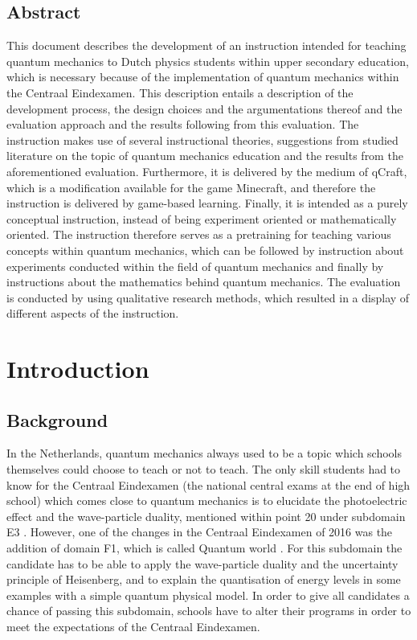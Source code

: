 \documentclass[11pt,twoside]{report} %
\begin{document}
\chapter{Abstract}

This document describes the development of an instruction intended for teaching quantum mechanics to Dutch physics students within upper secondary education, which is necessary because of the implementation of quantum mechanics within the Centraal Eindexamen. This description entails a description of the development process, the design choices and the argumentations thereof and the evaluation approach and the results following from this evaluation. The instruction makes use of several instructional theories, suggestions from studied literature on the topic of quantum mechanics education and the results from the aforementioned evaluation. Furthermore, it is delivered by the medium of qCraft, which is a modification available for the game Minecraft, and therefore the instruction is delivered by game-based learning. Finally, it is intended as a purely conceptual instruction, instead of being experiment oriented or mathematically oriented. The instruction therefore serves as a pretraining for teaching various concepts within quantum mechanics, which can be followed by instruction about experiments conducted within the field of quantum mechanics and finally by instructions about the mathematics behind quantum mechanics. The evaluation is conducted by using qualitative research methods, which resulted in a display of different aspects of the instruction.

\part{Introduction}

\chapter{Background}

In the Netherlands, quantum mechanics always used to be a topic which schools themselves could choose to teach or not to teach. The only skill students had to know for the Centraal Eindexamen (the national central exams at the end of high school) which comes close to quantum mechanics is to elucidate the photoelectric effect and the wave-particle duality, mentioned within point 20 under subdomain E3 \cite{eindexamen2015}. However, one of the changes in the Centraal Eindexamen of 2016 was the addition of domain F1, which is called Quantum world \cite{eindexamen2016}. For this subdomain the candidate has to be able to apply the wave-particle duality and the uncertainty principle of Heisenberg, and to explain the quantisation of energy levels in some examples with a simple quantum physical model. In order to give all candidates a chance of passing this subdomain, schools have to alter their programs in order to meet the expectations of the Centraal Eindexamen.
\end{document}
